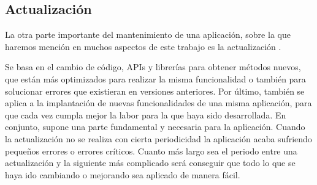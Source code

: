 \subsection{Actualización}

La otra parte importante del mantenimiento de una aplicación, sobre la que haremos mención en muchos aspectos de este trabajo es la actualización \cite{actu1}. 

Se basa en el cambio de código, APIs y librerías para obtener métodos nuevos, que están más optimizados para realizar la misma funcionalidad o también para solucionar errores que existieran en versiones anteriores. Por último, también se aplica a la implantación de nuevas funcionalidades de una misma aplicación, para que cada vez cumpla mejor la labor para la que haya sido desarrollada. En conjunto, supone una parte fundamental y necesaria para la aplicación. Cuando la actualización no se realiza con cierta periodicidad la aplicación acaba sufriendo pequeños errores o errores críticos. Cuanto más largo sea el periodo entre una actualización y la siguiente más complicado será conseguir que todo lo que se haya ido cambiando o mejorando sea aplicado de manera fácil.


